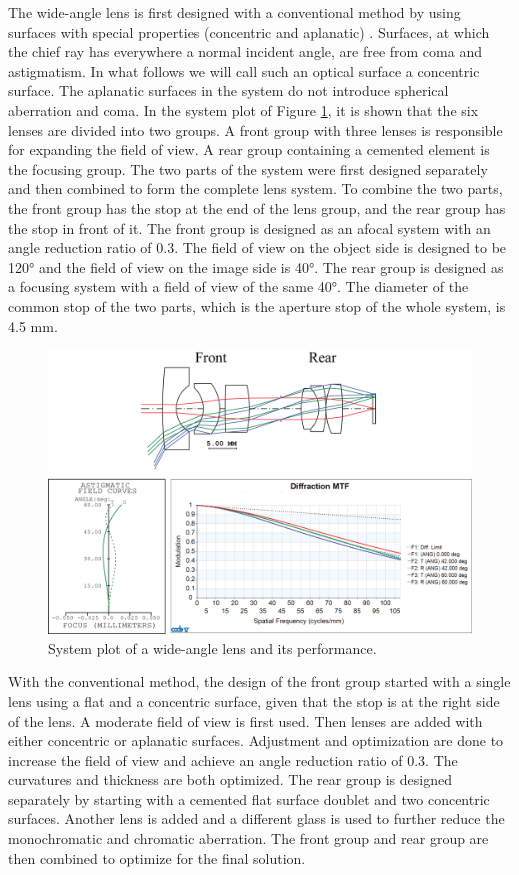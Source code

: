 The wide-angle lens is first designed with a conventional method by using surfaces with special properties (concentric and aplanatic) \cite{LivshitsQA2013}. Surfaces, at which the chief ray has everywhere a normal incident angle, are free from coma and astigmatism. In what follows we will call such an optical surface a concentric surface. The aplanatic surfaces in the system do not introduce spherical aberration and coma. In the system plot of Figure \ref{fig:wideanglelensPerformance}, it is shown that the six lenses are divided into two groups. A front group with three lenses is responsible for expanding the field of view. A rear group containing a cemented element is the focusing group. The two parts of the system were first designed separately and then combined to form the complete lens system. To combine the two parts, the front group has the stop at the end of the lens group, and the rear group has the stop in front of it.  The front group is designed as an afocal system with an angle reduction ratio of 0.3. The field of view on the object side is designed to be 120° and the field of view on the image side is 40°. The rear group is designed as a focusing system with a field of view of the same 40°. The diameter of the common stop of the two parts, which is the aperture stop of the whole system, is 4.5 mm. 

\begin{figure}[h!]
    \centering
    \includegraphics[scale=0.68]{chapter-4/figures/WideAngleL.png}
    \caption{System plot of a wide-angle lens and its performance.}
    \label{fig:wideanglelensPerformance}
\end{figure}

With the conventional method, the design of the front group started with a single lens using a flat and a concentric surface, given that the stop is at the right side of the lens. A moderate field of view is first used. Then lenses are added with either concentric or aplanatic surfaces. Adjustment and optimization are done to increase the field of view and achieve an angle reduction ratio of 0.3. The curvatures and thickness are both optimized. The rear group is designed separately by starting with a cemented flat surface doublet and two concentric surfaces. Another lens is added and a different glass is used to further reduce the monochromatic and chromatic aberration. The front group and rear group are then combined to optimize for the final solution.

